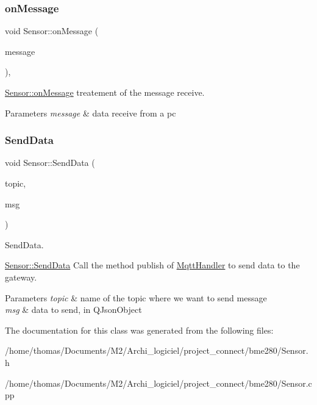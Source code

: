 \subsubsection{\texorpdfstring{on\+Message}{onMessage}}
{\footnotesize\ttfamily void Sensor\+::on\+Message (\begin{DoxyParamCaption}\item[{Q\+Mqtt\+Message}]{message }\end{DoxyParamCaption})\hspace{0.3cm}{\ttfamily [override]}, {\ttfamily [slot]}}



\hyperlink{classSensor_adead6577984a7d6b765897ba001ed176}{Sensor\+::on\+Message} treatement of the message receive. 


\begin{DoxyParams}{Parameters}
{\em message} & data receive from a pc \\
\hline
\end{DoxyParams}
\mbox{\label{classSensor_acace9ac9768e13174608c9e3649226f6}} 
\subsubsection{\texorpdfstring{Send\+Data}{SendData}}
{\footnotesize\ttfamily void Sensor\+::\+Send\+Data (\begin{DoxyParamCaption}\item[{Q\+String}]{topic,  }\item[{Q\+Json\+Object}]{msg }\end{DoxyParamCaption})\hspace{0.3cm}{\ttfamily [slot]}}



Send\+Data. 

\hyperlink{classSensor_acace9ac9768e13174608c9e3649226f6}{Sensor\+::\+Send\+Data} Call the method publish of \hyperlink{classMqttHandler}{Mqtt\+Handler} to send data to the gateway.


\begin{DoxyParams}{Parameters}
{\em topic} & name of the topic where we want to send message \\
\hline
{\em msg} & data to send, in Q\+Json\+Object \\
\hline
\end{DoxyParams}


The documentation for this class was generated from the following files\+:\begin{DoxyCompactItemize}
\item 
/home/thomas/\+Documents/\+M2/\+Archi\+\_\+logiciel/project\+\_\+connect/bme280/Sensor.\+h\item 
/home/thomas/\+Documents/\+M2/\+Archi\+\_\+logiciel/project\+\_\+connect/bme280/Sensor.\+cpp\end{DoxyCompactItemize}
